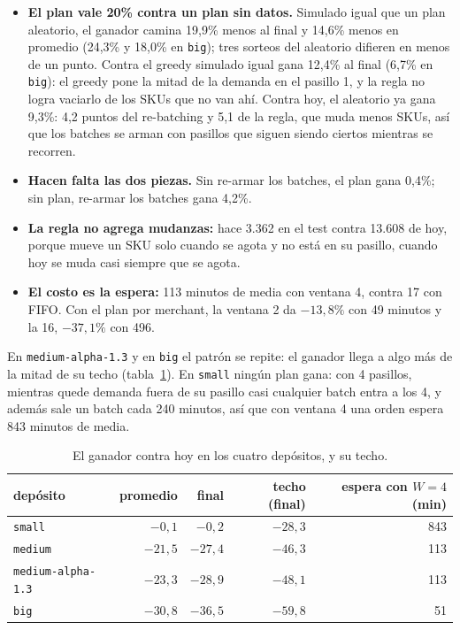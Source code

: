 \documentclass[11pt,a4paper,oneside]{report}
\newcommand{\code}[1]{\texttt{\small #1}}
\begin{document}
\begin{itemize}
  \item \textbf{El plan vale 20\% contra un plan sin datos.} Simulado igual que un plan
        aleatorio, el ganador camina 19,9\% menos al final y 14,6\% menos en promedio (24,3\% y
        18,0\% en \code{big}); tres sorteos del aleatorio difieren en menos de un punto. Contra el
        greedy simulado igual gana 12,4\% al final (6,7\% en \code{big}): el greedy pone la mitad
        de la demanda en el pasillo 1, y la regla no logra vaciarlo de los SKUs que no van ahí. Contra
        hoy, el aleatorio ya gana 9,3\%: 4,2 puntos del re-batching y 5,1 de la regla, que muda
        menos SKUs, así que los batches se arman con pasillos que siguen siendo ciertos mientras
        se recorren.
  \item \textbf{Hacen falta las dos piezas.} Sin re-armar los batches, el plan gana 0,4\%; sin
        plan, re-armar los batches gana 4,2\%.
  \item \textbf{La regla no agrega mudanzas:} hace 3.362 en el test contra 13.608 de hoy, porque
        mueve un SKU solo cuando se agota y no está en su pasillo, cuando hoy se muda casi
        siempre que se agota.
  \item \textbf{El costo es la espera:} 113 minutos de media con ventana 4, contra 17 con FIFO.
        Con el plan por merchant, la ventana 2 da $-13{,}8\%$ con 49 minutos y la 16,
        $-37{,}1\%$ con 496.
\end{itemize}

En \code{medium-alpha-1.3} y en \code{big} el patrón se repite: el ganador llega a algo más de
la mitad de su techo (tabla~\ref{tab:depositos}). En \code{small} ningún plan gana: con 4
pasillos, mientras quede demanda fuera de su pasillo casi cualquier batch entra a los 4, y
además sale un batch cada 240 minutos, así que con ventana 4 una orden espera 843 minutos de
media.

\begin{table}[ht]
\centering\small
\begin{tabular}{@{}lrrrr@{}}
\toprule
depósito & promedio & final & techo (final) & espera con $W = 4$ (min) \\
\midrule
\code{small} & $-0{,}1$ & $-0{,}2$ & $-28{,}3$ & 843 \\
\code{medium} & $-21{,}5$ & $-27{,}4$ & $-46{,}3$ & 113 \\
\code{medium-alpha-1.3} & $-23{,}3$ & $-28{,}9$ & $-48{,}1$ & 113 \\
\code{big} & $-30{,}8$ & $-36{,}5$ & $-59{,}8$ & 51 \\
\bottomrule
\end{tabular}
\caption{El ganador contra hoy en los cuatro depósitos, y su techo.}
\label{tab:depositos}
\end{table}
\end{document}
